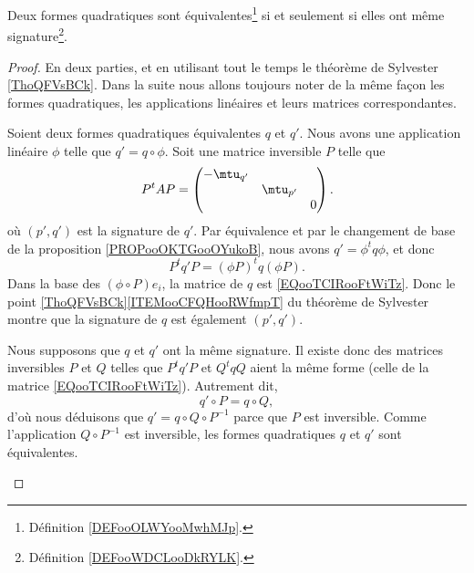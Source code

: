 \begin{proposition}       \label{PROPooBWXMooLsgyKm}
	Deux formes quadratiques sont équivalentes\footnote{Définition \ref{DEFooOLWYooMwhMJp}.} si et seulement si elles ont même signature\footnote{Définition \ref{DEFooWDCLooDkRYLK}.}.
\end{proposition}

\begin{proof}
	En deux parties, et en utilisant tout le temps le théorème de Sylvester \ref{ThoQFVsBCk}. Dans la suite nous allons toujours noter de la même façon les formes quadratiques, les applications linéaires et leurs matrices correspondantes.

	\begin{subproof}
		\spitem[\( \Rightarrow\)]
		Soient deux formes quadratiques équivalentes \( q\) et \( q'\). Nous avons une application linéaire \( \phi\) telle que \( q'=q\circ \phi\). Soit une matrice inversible \( P\) telle que
		\begin{equation}		\label{EQooTCIRooFtWiTz}
			P^tAP=\begin{pmatrix}
				-\mtu_{q'} &           &   \\
				           & \mtu_{p'} &   \\
				           &           & 0
			\end{pmatrix}.
		\end{equation}
		où \( (p',q')\) est la signature de \( q'\). Par équivalence et par le changement de base de la proposition \ref{PROPooOKTGooOYukoB}, nous avons \( q'=\phi^t q\phi\), et donc
		\begin{equation}
			P^tq'P =	(\phi P)^tq(\phi P).
		\end{equation}
		Dans la base des \( (\phi\circ P)e_i\), la matrice de \( q\) est \eqref{EQooTCIRooFtWiTz}. Donc le point \ref{ThoQFVsBCk}\ref{ITEMooCFQHooRWfmpT} du théorème de Sylvester montre que la signature de \( q\) est également \( (p',q')\).

		\spitem[\( \Rightarrow\)]
		Nous supposons que \( q\) et \( q'\) ont la même signature. Il existe donc des matrices inversibles \( P\) et \( Q\) telles que \( P^tq'P\) et \( Q^tqQ\) aient la même forme (celle de la matrice \eqref{EQooTCIRooFtWiTz}). Autrement dit,
		\begin{equation}
			q'\circ P=q\circ Q,
		\end{equation}
		d'où nous déduisons que \( q'=q\circ Q\circ P^{-1}\) parce que \( P\) est inversible. Comme l'application \( Q\circ P^{-1}\) est inversible, les formes quadratiques \( q\) et \( q'\) sont équivalentes.
	\end{subproof}
\end{proof}

